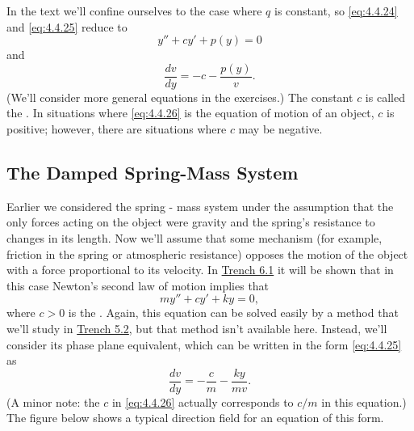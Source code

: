\documentclass{ximera}
\begin{document}
In the text we'll confine ourselves to the case where $q$
is constant, so \eqref{eq:4.4.24} and \eqref{eq:4.4.25}  reduce to
\begin{equation} \label{eq:4.4.26}
y''+cy'+p(y)=0
\end{equation}
and
$$
\frac{dv}{dy}=-c-\frac{p(y)}{v}.
$$
(We'll consider more general equations in the exercises.) The constant
$c$ is called the . In situations where
\eqref{eq:4.4.26} is the equation of motion of an object, $c$ is positive;
however, there are situations where  $c$ may be negative.
 
\subsection*{The Damped Spring-Mass System}
 
Earlier we considered
the spring - mass system under the assumption that the only forces
acting on the object were gravity and the spring's resistance to
changes in its length. Now we'll assume that some mechanism (for
example, friction in the spring or atmospheric resistance) opposes the
motion of the object with a force proportional to its velocity. In \href{https://ximera.osu.edu/ode/main/springProblemsI/springProblemsI}{Trench 6.1} it will be shown that in this case Newton's
second law of motion implies that
\begin{equation} \label{eq:4.4.27}
my''+cy'+ky=0,
\end{equation}
where $c>0$ is the . Again, this
equation can
be solved easily by a method that we'll study in \href{https://ximera.osu.edu/ode/main/constantCoefficientHomogeneousEquations/constantCoefficientHomogeneousEquations}{Trench 5.2},
but that method isn't available here. Instead, we'll consider its
phase plane equivalent, which can be written in the form \eqref{eq:4.4.25}
as
\begin{equation} \label{eq:4.4.28}
\frac{dv}{dy}=-\frac{c}{m}-\frac{ky}{mv}.
\end{equation}
(A minor note: the $c$ in \eqref{eq:4.4.26} actually corresponds to
$c/m$ in this equation.) The figure below shows a
typical direction field for an equation of this form.


\begin{center}
\end{center}

 
\end{document}
